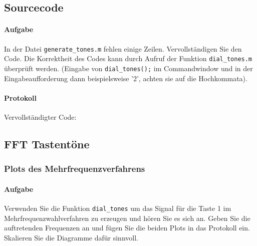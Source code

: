 \documentclass[10pt]{scrreprt}
\begin{document}
        \subsection{Sourcecode}
        \paragraph{Aufgabe}
        In der Datei \texttt{generate\_tones.m} fehlen einige Zeilen. Vervollständigen Sie den Code. Die
        Korrektheit des Codes kann durch Aufruf der Funktion \texttt{dial\_tones.m} überprüft werden.
        (Eingabe von \texttt{dial\_tones();} im Commandwindow und in der Eingabeaufforderung dann
        beispielsweise ’2’, achten sie auf die Hochkommata).
        \paragraph{Protokoll}
        Vervollständigter Code:
        

        \vspace{2cm}

        

        \subsection{FFT Tastentöne}
        \subsubsection{Plots des Mehrfrequenzverfahrens}
        \paragraph{Aufgabe}
        Verwenden Sie die Funktion \texttt{dial\_tones} um das Signal für die Taste
        \glqq{}1\grqq{} im Mehrfrequenzwahlverfahren
        zu erzeugen und hören Sie es sich an. Geben Sie die auftretenden
        Frequenzen an und fügen Sie die beiden Plots in das Protokoll ein. Skalieren
        Sie die Diagramme dafür sinnvoll.
\end{document}

